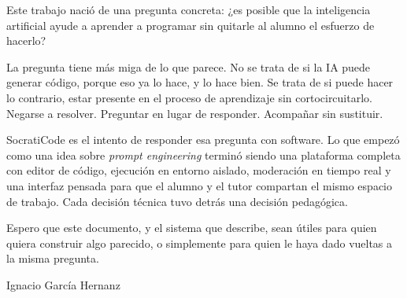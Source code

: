 Este trabajo nació de una pregunta concreta: ¿es posible que la inteligencia artificial ayude a aprender a programar sin quitarle al alumno el esfuerzo de hacerlo?

La pregunta tiene más miga de lo que parece. No se trata de si la IA puede generar código, porque eso ya lo hace, y lo hace bien. Se trata de si puede hacer lo contrario, estar presente en el proceso de aprendizaje sin cortocircuitarlo. Negarse a resolver. Preguntar en lugar de responder. Acompañar sin sustituir.

SocratiCode es el intento de responder esa pregunta con software. Lo que empezó como una idea sobre \textit{prompt engineering} terminó siendo una plataforma completa con editor de código, ejecución en entorno aislado, moderación en tiempo real y una interfaz pensada para que el alumno y el tutor compartan el mismo espacio de trabajo. Cada decisión técnica tuvo detrás una decisión pedagógica.

Espero que este documento, y el sistema que describe, sean útiles para quien quiera construir algo parecido, o simplemente para quien le haya dado vueltas a la misma pregunta.

\hfill \begin{flushright}Ignacio García Hernanz\end{flushright}\hfill
